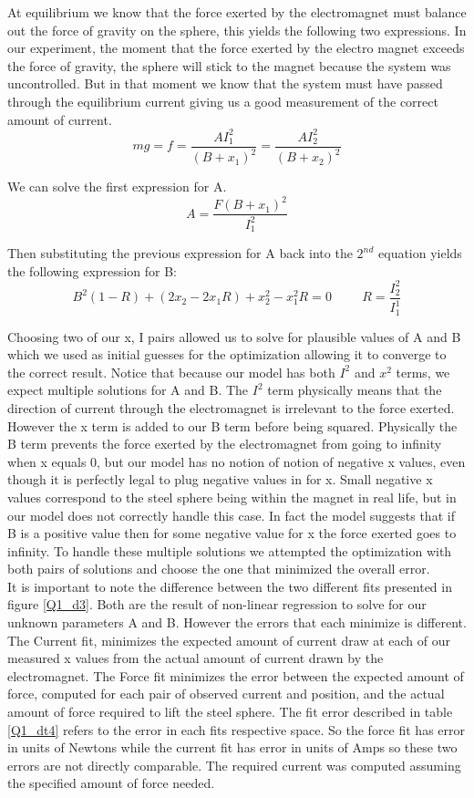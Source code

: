 \documentclass{article}
\theoremstyle{plain}
\theoremstyle{definition}
\theoremstyle{remark}
\begin{document}
At equilibrium we know that the force exerted by the electromagnet must balance out the force of gravity on the sphere, this yields the following two expressions.  In our experiment, the moment that the force exerted by the electro magnet exceeds the force of gravity, the sphere will stick to the magnet because the system was uncontrolled.  But in that moment we know that the system must have passed through the equilibrium current giving us a good measurement of the correct amount of current.
$$ mg = f = \frac{A I_{1}^2}{(B+x_{1})^2}  = \frac{A I_{2}^2}{(B+x_{2})^2} $$ 

We can solve the first expression for A.
$$ A = \frac{F (B + x_{1})^2}{I_{1}^2}$$

Then substituting the previous expression for A back into the $2^{nd}$ equation yields the following expression for B:
$$ B^2(1-R) + (2x_2-2x_1R)+x_2^2-x_1^2R = 0 \hspace{1cm} R = \frac{I_2^2}{I_1^1} $$

Choosing two of our x, I pairs allowed us to solve for plausible values of A and B which we used as initial guesses for the optimization allowing it to converge to the correct result.  Notice that because our model has both $I^2$ and $x^2$ terms, we expect multiple solutions for A and B.  The $I^2$ term physically means that the direction of current through the electromagnet is irrelevant to the force exerted.  However the x term is added to our B term before being squared.  Physically the B term prevents the force exerted by the electromagnet from going to infinity when x equals 0, but our model has no notion of notion of negative x values, even though it is perfectly legal to plug negative values in for x.  Small negative x values correspond to the steel sphere being within the magnet in real life, but in our model does not correctly handle this case.  In fact the model suggests that if B is a positive value then for some negative value for x the force exerted goes to infinity.  To handle these multiple solutions we attempted the optimization with both pairs of solutions and choose the one that minimized the overall error.\\

 It is important to note the difference between the two different fits presented in figure \ref{Q1_d3}.  Both are the result of non-linear regression to solve for our unknown parameters A and B.  However the errors that each minimize is different.  The Current fit, minimizes the expected amount of current draw at each of our measured x values from the actual amount of current drawn by the electromagnet.  The Force fit minimizes the error between the expected amount of force, computed for each pair of observed current and position, and the actual amount of force required to lift the steel sphere.  The fit error described in table \ref{Q1_dt4} refers to the error in each fits respective space.  So the force fit has error in units of Newtons while the current fit has error in units of Amps so these two errors are not directly comparable.  The required current was computed assuming the specified amount of force needed.\\
\end{document}
